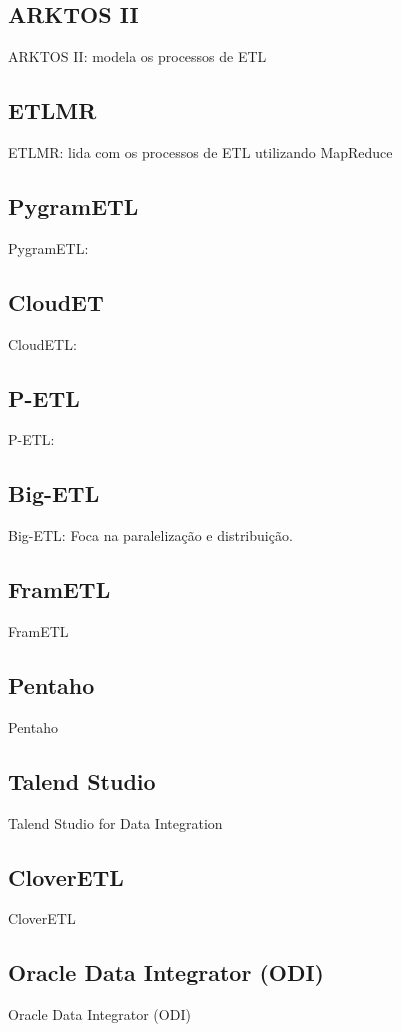 \subsection{ARKTOS II}
ARKTOS II: modela os processos de ETL

\subsection{ETLMR}
ETLMR: lida com os processos de ETL utilizando MapReduce

\subsection{PygramETL}
PygramETL: 

\subsection{CloudET}
CloudETL:

\subsection{P-ETL}
P-ETL:

\subsection{Big-ETL}
Big-ETL: Foca na paralelização e distribuição.

\subsection{FramETL}
FramETL

\subsection{Pentaho}
Pentaho

\subsection{Talend Studio}
Talend Studio for Data Integration

\subsection{CloverETL}
CloverETL

\subsection{Oracle Data Integrator (ODI)}
Oracle Data Integrator (ODI)